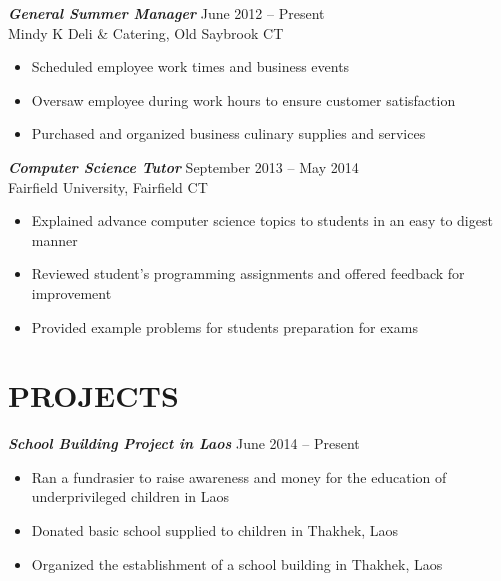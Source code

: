 \documentclass[margin, 10pt]{res}
\begin{document}
\begin{resume}
{%
{\sl \textbf{General Summer Manager}} \hfill June 2012 -- Present\\
{\small{Mindy K Deli \& Catering, Old Saybrook CT}}
\begin{itemize} \itemsep -1.5pt %
  \item Scheduled employee work times and business events
  \item Oversaw employee during work hours to ensure customer satisfaction
  \item Purchased and organized business culinary supplies and services
\end{itemize}
%
{\sl \textbf{Computer Science Tutor}} \hfill September 2013 --  May 2014 \\
{\small{Fairfield University, Fairfield CT}}
\begin{itemize} \itemsep -1.5pt %
  \item Explained advance computer science topics to students in an easy to digest manner
  \item Reviewed student's programming assignments and offered feedback for improvement
  \item Provided example problems for students preparation for exams
\end{itemize}
\section{PROJECTS}
{\sl \textbf{School Building Project in Laos}} \hfill June 2014 -- Present
\begin{itemize} \itemsep -1.5pt %
  \item Ran a fundrasier to raise awareness and money for the education of underprivileged children in Laos
  \item Donated basic school supplied to children in Thakhek, Laos
  \item Organized the establishment of a school building in Thakhek, Laos
\end{itemize}
}
\end{resume}
\end{document}
